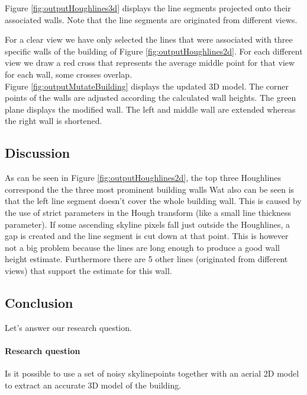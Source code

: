 Figure \ref{fig:outputHoughlines3d} 
 displays the line segments projected onto their associated walls.
Note that the line segments are originated from different views. 
 
For a clear view we have only selected the lines that were associated with three
specific walls of the building of Figure \ref{fig:outputHoughlines2d}.  
For each different view we draw a red cross that represents the average middle
point for that view for each wall, some crosses overlap.\\

Figure \ref{fig:outputMutateBuilding} 
displays the updated 3D model. The
corner points of the walls are adjusted according the calculated wall heights.
The green plane displays the modified wall. The left and middle wall are extended
whereas the right wall is shortened.\\


\subsection{Discussion}
As can be seen in Figure \ref{fig:outputHoughlines2d}, 
the top three Houghlines correspond the the three most prominent building walls
Wat also can be seen is that the left line segment doesn't cover the whole
building wall. This is caused by the use of strict parameters in the Hough transform
(like a small line thickness parameter).  If some ascending skyline pixels fall just outside
the Houghlines, a gap is created and the line segment is cut down at that point.
This is however not a big problem because the lines are long enough to produce a
good wall height estimate. Furthermore there are 5 other lines
(originated from different views) that support the estimate for this wall.\\



\subsection{Conclusion}
Let's answer our research question.
\paragraph{Research question}
Is it possible to use a set of noisy skylinepoints together with an aerial 2D model to 
extract an accurate 3D model of the building.\\

